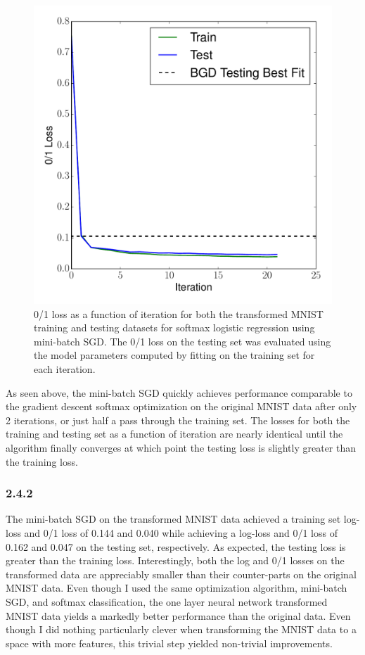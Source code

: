 \documentclass[12pt]{amsart}
\begin{document}
\begin{figure}[H]
	\includegraphics[width=\columnwidth]{sgd_nn_mnist_multi_train_test_01.pdf}
    \caption{0/1 loss as a function of iteration for both the transformed MNIST training and testing datasets for softmax logistic regression using mini-batch SGD.  The 0/1 loss on the testing set was evaluated using the model parameters computed by fitting on the training set for each iteration.}
    \label{fig:sgd_nn_mini_mnist_01}
\end{figure}

As seen above, the mini-batch SGD quickly achieves performance comparable to the gradient descent softmax optimization on the original MNIST data after only 2 iterations, or just half a pass through the training set.  The losses for both the training and testing set as a function of iteration are nearly identical until the algorithm finally converges at which point the testing loss is slightly greater than the training loss.

\subsubsection*{2.4.2}

The mini-batch SGD on the transformed MNIST data achieved a training set log-loss and 0/1 loss of 0.144 and 0.040 while achieving a log-loss and 0/1 loss of 0.162 and 0.047 on the testing set, respectively.  As expected, the testing loss is greater than the training loss.  Interestingly, both the log and 0/1 losses on the transformed data are appreciably smaller than their counter-parts on the original MNIST data.  Even though I used the same optimization algorithm, mini-batch SGD, and softmax classification, the one layer neural network transformed MNIST data yields a markedly better performance than the original data.  Even though I did nothing particularly clever when transforming the MNIST data to a space with more features, this trivial step yielded non-trivial improvements.
\end{document}
